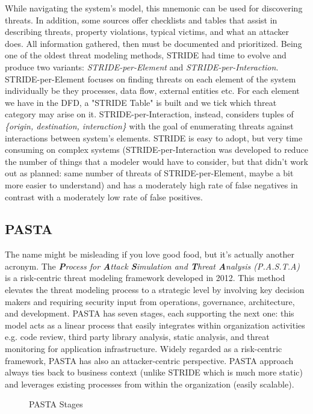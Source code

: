 While navigating the system's model, this mnemonic can be used for discovering threats. In addition, some sources offer checklists and tables that assist in describing threats, property violations, typical victims, and what an attacker does. All information gathered, then must be documented and prioritized. Being one of the oldest threat modeling methods, STRIDE had time to evolve and produce two variants: \textit{STRIDE-per-Element} and \textit{STRIDE-per-Interaction}. STRIDE-per-Element focuses on finding threats on each element of the system individually be they processes, data flow, external entities etc. For each element we have in the DFD, a "STRIDE Table" is built and we tick which threat category may arise on it. STRIDE-per-Interaction, instead, considers tuples of \textit{\{origin, destination, interaction\}} with the goal of enumerating threats against interactions between system's elements. STRIDE is easy to adopt, but very time consuming on complex systems (STRIDE-per-Interaction was developed to reduce the number of things that a modeler would have to consider, but that didn't work out as planned: same number of threats of STRIDE-per-Element, maybe a bit more easier to understand) and has a moderately high rate of false negatives in contrast with a moderately low rate of false positives.
\subsection{PASTA}
The name might be misleading if you love good food, but it's actually another acronym. The \textit{\textbf{P}rocess for \textbf{A}ttack \textbf{S}imulation and \textbf{T}hreat \textbf{A}nalysis (P.A.S.T.A)} is a risk-centric threat modeling framework developed in 2012. This method elevates the threat modeling process to a strategic level by involving key decision makers and requiring security input from operations, governance, architecture, and development. PASTA has seven stages, each supporting the next one: this model acts as a linear process that easily integrates within organization activities e.g. code review, third party library analysis, static analysis, and threat monitoring for application infrastructure. Widely regarded as a risk-centric framework, PASTA has also an attacker-centric perspective. PASTA approach always ties back to business context (unlike STRIDE which is much more static) and leverages existing processes from within the organization (easily scalable). 
\begin{figure}[H]
  \centering
  
  \caption{PASTA Stages}
\end{figure}
